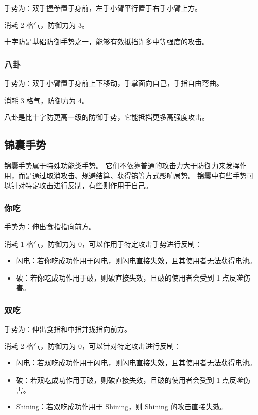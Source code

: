 \documentclass[12pt]{ctexart}
\begin{document}
手势为：双手握拳置于身前，左手小臂平行置于右手小臂上方。

消耗 2 格气，防御力为 3。

十字防是基础防御手势之一，能够有效抵挡许多中等强度的攻击。

\subsubsection{八卦}

手势为：双手小臂置于身前上下移动，手掌面向自己，手指自由弯曲。

消耗 3 格气，防御力为 4。

八卦是比十字防更高一级的防御手势，它能抵挡更多高强度攻击。

\subsection{锦囊手势}

锦囊手势属于特殊功能类手势。
它们不依靠普通的攻击力大于防御力来发挥作用，而是通过取消攻击、规避结算、获得镐等方式影响局势。
锦囊中有些手势可以针对特定攻击进行反制，有些则作用于自己。

\subsubsection{你吃}

手势为：伸出食指指向前方。

消耗 1 格气，防御力为 0，可以作用于特定攻击手势进行反制：

\begin{itemize}
    \item 闪电：若你吃成功作用于闪电，则闪电直接失效，且其使用者无法获得电池。
    \item 破：若你吃成功作用于破，则破直接失效，且破的使用者会受到 1 点反噬伤害。
\end{itemize}

\subsubsection{双吃}

手势为：伸出食指和中指并拢指向前方。

消耗 2 格气，防御力为 0，可以针对特定攻击进行反制：

\begin{itemize}
    \item 闪电：若双吃成功作用于闪电，则闪电直接失效，且其使用者无法获得电池。
    \item 破：若双吃成功作用于破，则破直接失效，且破的使用者会受到 1 点反噬伤害。
    \item Shining：若双吃成功作用于 Shining，则 Shining 的攻击直接失效。
\end{itemize}
\end{document}
